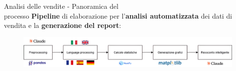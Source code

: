 \documentclass{beamer}
\begin{document}
	\begin{frame}{Analisi delle vendite - Panoramica del\\ processo}
		\textbf{Pipeline} di elaborazione per l'\textbf{analisi automatizzata} dei dati di vendita e la \textbf{generazione del report}:

		\begin{figure}
			\centering
			\includegraphics[width=\textwidth]{Diagramma pipeline analisi delle vendite.png}
		\end{figure}
	\end{frame}
\end{document}

